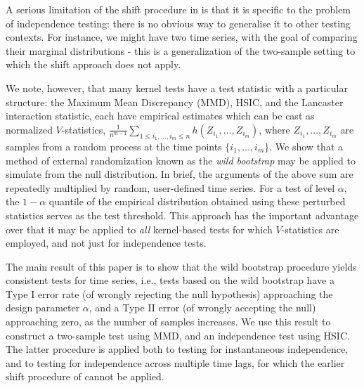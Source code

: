 A serious limitation of the shift procedure in \cite{chwialkowski2014kernel} is that it is specific
to the problem of independence testing: there is no obvious way to generalise it to  other
testing contexts. For instance, we might have two time series, with the goal of comparing
their marginal distributions - this is a generalization of the two-sample setting to which the shift
approach does not apply.

We note, however, that many kernel tests have a test statistic with a particular structure:  the Maximum Mean Discrepancy (MMD), HSIC, and the Lancaster interaction statistic,
each have empirical estimates which can be cast as normalized $V$-statistics,
$\frac{1} {n^{m-1}} \sum_{1\leq i_1,...,i_m \leq n} h(Z_{i_1},...,Z_{i_m})$,
where $Z_{i_1},...,Z_{i_m}$ are samples from a random process at the time points $\{i_1,\ldots,i_m\}$. We show that
a method of external randomization known as the {\em wild bootstrap} may be applied  \cite{leucht_dependent_2013,Shao2010} to simulate from the null distribution.
In brief, the arguments of the above sum are repeatedly multiplied by random, user-defined time series. For a test of level
$\alpha$, the $1-\alpha$ quantile of the empirical distribution obtained using these perturbed statistics serves as the test threshold. This approach has the important advantage over \cite{chwialkowski2014kernel} that it may be applied to {\em all} kernel-based tests for which $V$-statistics are employed, and not just for independence tests.

The main result of this paper is to show that the wild bootstrap procedure yields consistent tests for time series, i.e., tests based on the wild bootstrap  have a Type I error rate (of wrongly rejecting the null hypothesis) approaching the design parameter $\alpha$, and a Type II error (of wrongly accepting the null) approaching zero, as the number of samples increases. We use this result to construct a two-sample test using MMD, and an independence test using HSIC. The latter procedure is applied both to testing for instantaneous independence, and to testing for independence across multiple time lags, for which the earlier shift procedure of \cite{chwialkowski2014kernel} cannot be applied.



